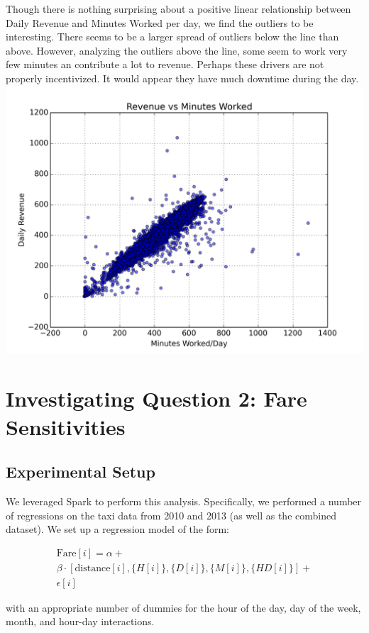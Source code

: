 \documentclass[twoside]{article}
\begin{document}
\begin{multicols}{2}
Though there is nothing surprising about a positive linear relationship between Daily Revenue and Minutes Worked per day, we find the outliers to be interesting. There seems to be a larger spread of outliers below the line than above. However, analyzing the outliers above the line, some seem to work very few minutes an contribute a lot to revenue. Perhaps these drivers are not properly incentivized. It would appear they have much downtime during the day. 
\includegraphics[scale=.35]{Minutes_v_Rev.png}

\section{Investigating Question 2: Fare Sensitivities}

\subsection{Experimental Setup}

We leveraged Spark to perform this analysis. Specifically, we performed a number of regressions on the taxi data from 2010 and 2013 (as well as the combined dataset). We set up a regression model of the form:


\begin{multline*}
\text{Fare}[i] = \alpha + \\
	\beta \cdot [\text{distance}[i], \{H[i]\}, \{D[i]\}, \{M[i]\},\{HD[i]\}] +\\
	 \epsilon[i]
\end{multline*}

\noindent with an appropriate number of dummies for the hour of the day, day of the week, month, and hour-day interactions. 


\end{multicols}
\end{document}
